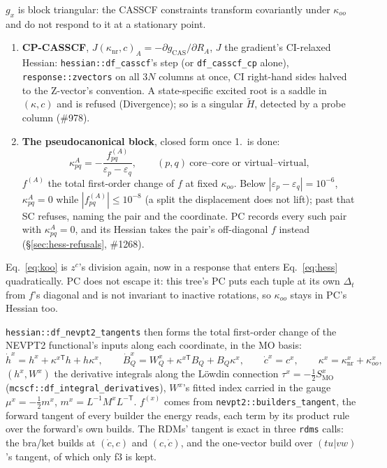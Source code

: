 \documentclass[11pt]{article}
\newcommand{\code}[1]{\texttt{#1}}
\newcommand{\eps}{\varepsilon}
\newcommand{\T}{\mathsf T}
\begin{document}
$g_x$ is block triangular: the CASSCF constraints transform covariantly
under $\kappa_{oo}$ and do not respond to it at a stationary point.
\begin{enumerate}
\item \textbf{CP-CASSCF}, $J(\kappa_{\mathrm{nr}}, c)_A = -\partial
  g_{\mathrm{CAS}}/\partial R_A$, $J$ the gradient's CI-relaxed Hessian:
  \code{hessian::df\_casscf}'s step (or \code{df\_casscf\_cp} alone),
  \code{response::zvectors} on all $3N$ columns at once, CI right-hand sides
  halved to the Z-vector's convention. A state-specific excited root is a
  saddle in $(\kappa, c)$ and is refused (Divergence); so is a singular
  $\tilde H$, detected by a probe column (\#978).
\item \textbf{The pseudocanonical block}, closed form once 1.\ is done:
  \begin{equation}
    \kappa^A_{pq} = -\frac{f^{(A)}_{pq}}{\eps_p - \eps_q},\qquad
    (p, q)\ \text{core--core or virtual--virtual},
    \label{eq:koo}
  \end{equation}
  $f^{(A)}$ the total first-order change of $f$ at fixed $\kappa_{oo}$.
  Below $|\eps_p - \eps_q| = 10^{-6}$, $\kappa^A_{pq} = 0$ while
  $|f^{(A)}_{pq}| \le 10^{-8}$ (a split the displacement does not lift);
  past that SC refuses, naming the pair and the coordinate. PC records every
  such pair with $\kappa^A_{pq} = 0$, and its Hessian takes the pair's
  off-diagonal $f$ instead (\S\ref{sec:hess-refusals}, \#1268).
\end{enumerate}
Eq.~\eqref{eq:koo} is $z^c$'s division again, now in a response that
enters Eq.~\eqref{eq:hess} quadratically. PC does not escape it: this tree's
PC puts each tuple at its own $\Delta_t$ from $f$'s diagonal and is not
invariant to inactive rotations, so $\kappa_{oo}$ stays in PC's Hessian too.

\code{hessian::df\_nevpt2\_tangents} then forms the total first-order change
of the NEVPT2 functional's inputs along each coordinate, in the MO basis:
\begin{equation}
  \dot h^x = h^x + \kappa^{x\T}h + h\kappa^x,\qquad
  \dot B^x_Q = W^x_Q + \kappa^{x\T}B_Q + B_Q\kappa^x,\qquad
  \dot c^x = c^x,\qquad
  \kappa^x = \kappa^x_{\mathrm{nr}} + \kappa^x_{oo},
  \label{eq:tx}
\end{equation}
$(h^x, W^x)$ the derivative integrals along the L\"owdin connection
$\tau^x = -\tfrac12 S^x_{\mathrm{MO}}$ (\code{mcscf::df\_integral\_derivatives}),
$W^x$'s fitted index carried in the gauge $\mu^x = -\tfrac12 m^x$,
$m^x = L^{-1}M^xL^{-\T}$. $f^{(x)}$ comes from \code{nevpt2::builders\_tangent},
the forward tangent of every builder the energy reads, each term by its
product rule over the forward's own builds. The RDMs' tangent is exact in
three \code{rdms} calls: the bra/ket builds at $(\dot c, c)$ and $(c, \dot c)$,
and the one-vector build over $(tu|vw)$'s tangent, of which only f3 is kept.
\end{document}
